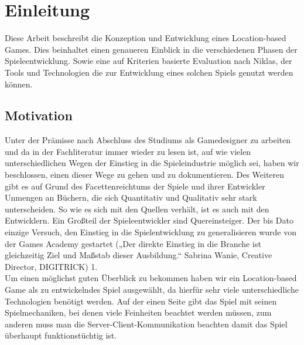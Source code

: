 \chapter{Einleitung}
\label{cha:einleitung}

Diese Arbeit beschreibt die Konzeption und Entwicklung eines Location-based Games. Dies beinhaltet einen genaueren Einblick in die verschiedenen Phasen der Spieleentwicklung. Sowie eine auf Kriterien basierte Evaluation nach Niklas, der Tools und Technologien die zur Entwicklung eines solchen Spiels genutzt werden können. 

\section{Motivation}
\label{sec:motivation}
Unter der Prämisse nach Abschluss des Studiums als Gamedesigner zu arbeiten und da in der Fachliteratur immer wieder zu lesen ist, auf wie vielen unterschiedlichen Wegen der Einstieg in die Spieleindustrie möglich sei, haben wir beschlossen, einen dieser Wege zu gehen und zu dokumentieren. Des Weiteren gibt es auf Grund des Facettenreichtums der Spiele und ihrer Entwickler Unmengen an Büchern, die sich Quantitativ und Qualitativ sehr stark unterscheiden. So wie es sich mit den Quellen verhält, ist es auch mit den Entwicklern. Ein Großteil der Spieleentwickler sind Quereinsteiger. Der bis Dato einzige Versuch, den Einstieg in die Spielentwicklung zu generalisieren wurde von der Games Academy gestartet („Der direkte Einstieg in die Branche ist gleichzeitig Ziel und Maßstab dieser Ausbildung.“ Sabrina Wanie, Creative Director, DIGITRICK) 1.\\
Um einen möglichst guten Überblick zu bekommen haben wir ein Location-based Game als zu entwickelndes Spiel ausgewählt, da hierfür sehr viele unterschiedliche Technologien benötigt werden. Auf der einen Seite gibt das Spiel mit seinen Spielmechaniken, bei denen viele Feinheiten beachtet werden müssen, zum anderen muss man die Server-Client-Kommunikation beachten damit das Spiel überhaupt funktionstüchtig ist. \\

